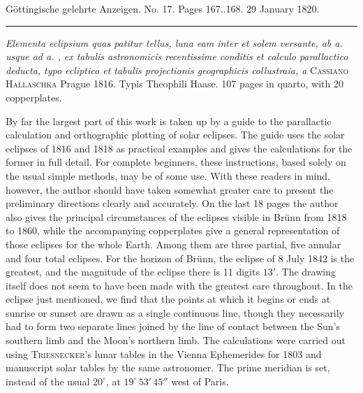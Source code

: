 \clearpage
{}
\begin{center}\small Göttingische gelehrte Anzeigen. No. 17. Pages 167..168. 29 January 1820.\\[3pt]\rule{.72\linewidth}{.3pt}\end{center}

\emph{Elementa eclipsium quas patitur tellus, luna eam inter et solem versante, ab a. {} usque ad a. {}, ex tabulis astronomicis recentissime conditis et calculo parallactico deducta, typo ecliptico et tabulis projectionis geographicis collustraia, a} \textsc{Cassiano Hallaschka} Prague 1816. Typis Theophili Haase. 107 pages in quarto, with 20 copperplates.

\begingroup{}\relax
By far the largest part of this work is taken up by a guide to the parallactic calculation and orthographic plotting of solar eclipses. The guide uses the solar eclipses of 1816 and 1818 as practical examples and gives the calculations for the former in full detail. For complete beginners, these instructions, based solely on the usual simple methods, may be of some use. With these readers in mind, however, the author should have taken somewhat greater care to present the preliminary directions clearly and accurately. On the last 18 pages the author also gives the principal circumstances of the eclipses visible in Brünn from 1818 to 1860, while the accompanying copperplates give a general representation of those eclipses for the whole Earth. Among them are three partial, five annular and four total eclipses. For the horizon of Brünn, the eclipse of 8 July 1842 is the greatest, and the magnitude of the eclipse there is 11 digits $13'$. The drawing itself does not seem to have been made with the greatest care throughout. In the eclipse just mentioned, we find that the points at which it begins or ends at sunrise or sunset are drawn as a single continuous line, though they necessarily had to form two separate lines joined by the line of contact between the Sun’s southern limb and the Moon’s northern limb. The calculations were carried out using \textsc{Triesnecker}'s lunar tables in the Vienna Ephemerides for 1803 and manuscript solar tables by the same astronomer. The prime meridian is set, instead of the usual $20^\circ$, at $19^\circ\,53'\,45''$ west of Paris.
\par\clearpage\endgroup
